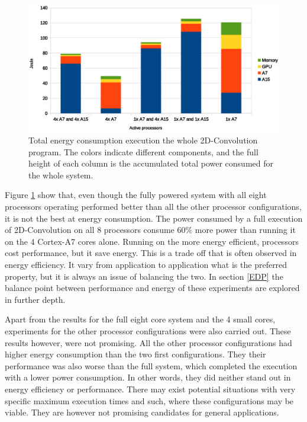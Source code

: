 \begin{figure}[H]
  \centering
  \includegraphics[width=160mm]{fig/power-consumed-configurations.eps}
  \caption{Total energy consumption execution the whole 2D-Convolution program. The colors indicate different components, and the full height of each column is the accumulated total power consumed for the whole system.\label{overflow}} \label {power-consumed-configurations}
\end{figure}

Figure \ref{power-consumed-configurations} show that, even though the fully powered system with all eight processors operating performed better than all the other processor configurations, it is not the best at energy consumption.
The power consumed by a full execution of 2D-Convolution on all 8 processors consume 60\% more power than running it on the 4 Cortex-A7 cores alone.
Running on the more energy efficient, processors cost performance, but it save energy.
This is a trade off that is often observed in energy efficiency.
It vary from application to application what is the preferred property, but it is always an issue of balancing the two.
In section \ref{EDP} the balance point between performance and energy of these experiments are explored in further depth.

Apart from the results for the full eight core system and the 4 small cores, experiments for the other processor configurations were also carried out.
These results however, were not promising.
All the other processor configurations had higher energy consumption than the two first configurations.
They their performance was also worse than the full system, which completed the execution with a lower power consumption.
In other words, they did neither stand out in energy efficiency or performance.
There may exist potential situations with very specific maximum execution times and such, where these configurations may be viable.
They are however not promising candidates for general applications.

